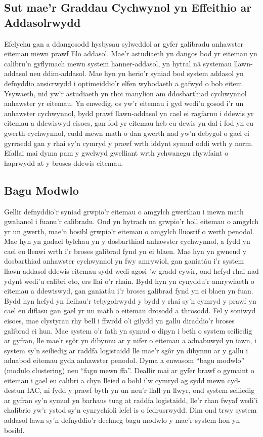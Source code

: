 \subsection{Sut mae'r Graddau Cychwynol yn Effeithio ar Addasolrwydd}
Efelychu gan \textcite{pelanek_applications_2016} a ddangosodd hysbysau sylweddol ar gyfer galibradu anhawster eitemau mewn prawf Elo addasol. Mae'r astudiaeth yn dangos bod yr eitemau yn calibru'n gyflymach mewn system hanner-addasol, yn hytral nâ systemau llawn-addasol neu ddim-addasol. Mae hyn yn herio'r syniad bod system addasol yn defnyddio ansicrwydd i optimeiddio'r elfen wybodaeth a gafwyd o bob eitem. Ysywaeth, nid yw'r astudiaeth yn rhoi manylion am ddosbarthiad cychwynnol anhawster yr eitemau. Yn enwedig, os yw'r eitemau i gyd wedi'u gosod i'r un anhawster cychwynnol, bydd prawf llawn-addasol yn cael ei ragfarnu i ddewis yr eitemau a ddewiswyd eisoes, gan fod yr eitemau heb eu dewis yn dal i fod yn eu gwerth cychwynnol, cudd mewn math o dan gwerth nad yw'n debygol o gael ei gyrraedd gan y rhai sy'n cymryd y prawf wrth iddynt symud oddi wrth y norm. Efallai mai dyma pam y gwelwyd gwelliant wrth ychwanegu rhywfaint o haprwydd at y broses ddewis eitemau.

\subsection{Bagu Modwlo}
Gellir defnyddio'r syniad grwpio'r eitemau o amgylch gwerthau i mewn math gwahanol i fuanu'r calibradu. Ond yn hytrach na grwpio'r holl eitemau o amgylch yr un gwerth, mae'n bosibl grwpio'r eitemau o amgylch lluosrif o werth penodol. Mae hyn yn gadael bylchau yn y dosbarthiad anhawster cychwynnol, a fydd yn cael eu llenwi wrth i'r broses galibrad fynd yn ei blaen. Mae hyn yn gwneud y dosbarthiad anhawster cychwynnol yn fwy amrywiol, gan ganiatáu i'r system llawn-addasol ddewis eitemau sydd wedi agosi 'w gradd cywir, ond hefyd rhai nad ydynt wedi'u calibri eto, ers llai o'r rhain. Bydd hyn yn cynyddu'r amrywiaeth o eitemau a ddewiswyd, gan ganiatáu i'r broses galibrad fynd yn ei blaen yn fuan. Bydd hyn hefyd yn lleihau'r tebygolrwydd y bydd y rhai sy'n cymryd y prawf yn cael eu diflasu gan gael yr un math o eitemau drosodd a throsodd. Fel y soniwyd eisoes, mae clystyrau rhy bell i ffwrdd o'i gilydd yn gallu diraddio'r broses galibrad ei hun. Mae system o'r fath yn symud o dipyn i beth o system seiliedig ar gyfran, lle mae'r sgôr yn dibynnu ar y nifer o eitemau a adnabuwyd yn iawn, i system sy'n seiliedig ar raddfa logistaidd lle mae'r sgôr yn dibynnu ar y gallu i adnabod eitemau gyda anhawster penodol. Dyma a enwasom ``bagu modwlo'' (modulo clustering) neu ``fagu mewn ffa''. Deallir mai ar gyfer brawf o gymaint o eitemau i gael eu calibri a chyn lleied o bobl i'w cymryd ag sydd mewn cyd-destun IAC, ni fydd y prawf byth yn un neu'r llall yn llwyr, ond system seiliedig ar gyfran sy'n symud yn barhaus tuag at raddfa logistaidd, lle'r rhan fwyaf wedi'i chalibrio yw'r ystod sy'n cynrychioli lefel is o fedrusrwydd. Dim ond trwy system addasol lawn sy'n defnyddio'r dechneg bagu modwlo y mae'r system hon yn bosibl. 

